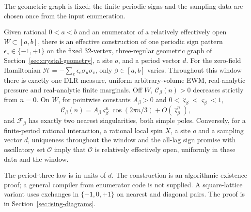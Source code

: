 The geometric graph is fixed; the finite periodic signs and the sampling data are chosen once from the input enumeration.
\begin{samepage}
\begin{theoremH}\label{thm:H}
Given rational \(0<a<b\) and an enumerator of a relatively effectively open \(W\subset[a,b]\), there is an effective construction of one periodic sign pattern \(\epsilon_e\in\{-1,+1\}\) on the fixed 32-vertex, three-regular geometric graph of Section~\ref{sec:crystal-geometry}, a site \(o\), and a period vector \(d\). For the zero-field Hamiltonian \(\mathcal H=-\sum_e\epsilon_e\sigma_u\sigma_v\), only \(\beta\in[a,b]\) varies. Throughout this window there is exactly one DLR measure, uniform arbitrary-volume EWM, real-analytic pressure and real-analytic finite marginals. Off \(W\), \(\mathcal C_\beta(n)>0\) decreases strictly from \(n=0\). On \(W\), for pointwise constants \(A_\beta>0\) and \(0<\widehat\varsigma_\beta<\varsigma_\beta<1\),
\[
\mathcal C_\beta(n)=A_\beta\varsigma_\beta^n\cos(2\pi n/3)+O(\widehat\varsigma_\beta^n),
\]
and \(\mathcal F_\beta\) has exactly two nearest singularities, both simple poles. Conversely, for a finite-period rational interaction, a rational local spin \(X\), a site \(o\) and a sampling vector \(d\), uniqueness throughout the window and the all-lag sign promise with oscillatory set \(\mathcal O\) imply that \(\mathcal O\) is relatively effectively open, uniformly in these data and the window.
\end{theoremH}
\end{samepage}
The period-three law is in units of \(d\). The construction is an algorithmic existence proof; a general compiler from enumerator code is not supplied. A square-lattice variant uses exchanges in \(\{-1,0,+1\}\) on nearest and diagonal pairs. The proof is in Section~\ref{sec:ising-diagrams}.

